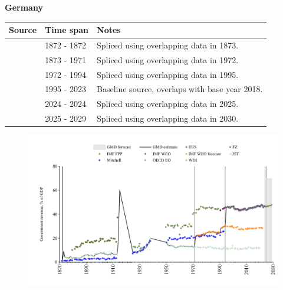 \documentclass[12pt,a4paper,landscape]{article}
\begin{document}
\begin{adjustbox}{max totalsize={\paperwidth}{\paperheight},center}
\begin{minipage}[t][\textheight][t]{\textwidth}
\vspace*{0.5cm}
{}
\begin{center}
{\Large\bfseries Germany}
\end{center}
\vspace{0.5cm}
\begin{table}[H]
\centering
\small
\begin{tabular}{|l|l|l|}
\hline
\textbf{Source} & \textbf{Time span} & \textbf{Notes} \\
\hline
\rowcolor{white}\cite{Mitchell}& 1872 - 1872 &Spliced using overlapping data in 1873.\\
\rowcolor{lightgray}\cite{JST}& 1873 - 1971 &Spliced using overlapping data in 1972.\\
\rowcolor{white}\cite{WDI}& 1972 - 1994 &Spliced using overlapping data in 1995.\\
\rowcolor{lightgray}\cite{OECD_EO}& 1995 - 2023 &Baseline source, overlaps with base year 2018.\\
\rowcolor{white}\cite{EUS}& 2024 - 2024 &Spliced using overlapping data in 2025.\\
\rowcolor{lightgray}\cite{IMF_WEO_forecast}& 2025 - 2029 &Spliced using overlapping data in 2030.\\
\hline
\end{tabular}
\end{table}
\begin{figure}[H]
\centering
\includegraphics[width=\textwidth,height=0.6\textheight,keepaspectratio]{graphs/DEU_govrev_GDP.pdf}
\end{figure}
\end{minipage}
\end{adjustbox}
\end{document}
